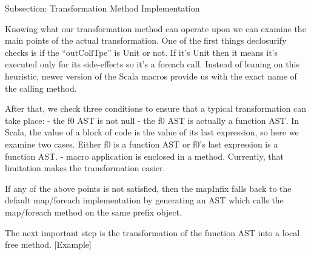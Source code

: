 Subsection: Transformation Method Implementation

Knowing what our transformation method can operate upon we can examine the
main points of the actual transformation. One of the first things declosurify
checks is if the ``outCollTpe'' is Unit or not. If it's Unit then it means it's
executed only for its side-effects so it's a foreach call. Instead of leaning on
this heuristic, newer version of the Scala macros provide us with the exact name
of the calling method.

After that, we check three conditions to ensure that a typical transformation
can take place:
- the f0 AST is not null
- the f0 AST is actually a function AST. In Scala, the value of a block
of code is the value of its last expression, so here we examine two cases.
Either f0 is a function AST or f0's last expression is a function AST.
- macro application is enclosed in a method. Currently, that limitation makes
the transformation easier.

If any of the above points is not satisfied, then the mapInfix falls back to the
default map/foreach implementation by generating an AST which
calls the map/foreach method on the same prefix object.

The next important step is the transformation of the function AST into a local
free method. [Example]
